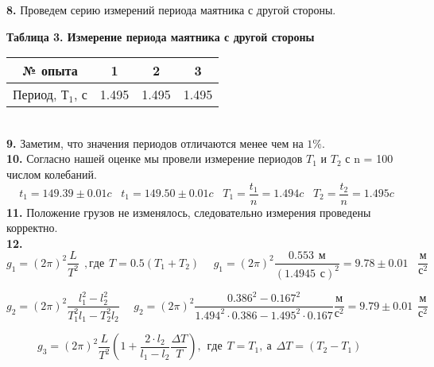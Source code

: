 \documentclass[a4paper, 12pt]{article}
\begin{document}
\textbf{8.} Проведем серию измерений периода маятника с другой стороны.\\
\begin{table}[h]
	\textbf{Таблица 3. Измерение периода маятника с другой стороны}\\
	\centering
	\begin{center}
		\begin{tabular}{|c|c|c|c|}
			\hline
			№ опыта & 1 & 2 & 3 \\
			\hline
			Период, $Т_1$, с  & 1.495 & 1.495 & 1.495 \\
			\hline
		\end{tabular}
	\end{center}
\end{table}\\ 
\textbf{9.} 
Заметим, что значения периодов отличаются менее чем на $1\%$.\\
\textbf{10.}
Согласно нашей оценке мы провели измерение периодов $T_1$ и $T_2$ с n = 100 числом колебаний.\\
$$ t_1 = 149.39\pm 0.01c \hspace{10pt} t_1 = 149.50 \pm 0.01c \hspace{10pt} T_1 = \frac{t_1}{n} = 1.494 c \hspace{10pt} T_2 = \frac{t_2}{n} = 1.495 c$$
\textbf{11.}
Положение грузов не изменялось, следовательно измерения проведены корректно.\\
\textbf{12.}
$$ g_1 = (2\pi)^2\frac{L}{T^2} \hspace{5pt},где\hspace{5pt} T = 0.5(T_1 + T_2) \hspace{15pt} g_1 = (2\pi)^2\frac{0.553\hspace{5pt}м}{(1.4945\hspace{5pt} с)^2} = 9.78\pm 0.01 \hspace{10pt} \frac{м}{с^2} $$

$$  g_2 = (2\pi)^2\frac{l_1^2 - l_2^2}{T_1^2l_1 - T_2^2l_2}\hspace{15pt}g_2 = (2\pi)^2\frac{0.386^2 - 0.167^2}{1.494^2\cdot0.386 - 1.495^2\cdot0.167}\frac{м}{с^2} = 9.79\pm0.01\hspace{5pt} \frac{м}{с^2} $$

$$ g_3 = (2\pi)^2\frac{L}{T^2}(1 + \frac{2\cdot l_2}{l_1 - l_2}\frac{\Delta T}{T}),\hspace{5pt} где\hspace{5pt} T = T_1,\:а\hspace{5pt}\Delta T = (T_2 - T_1)\hspace{15pt}$$
\end{document}
